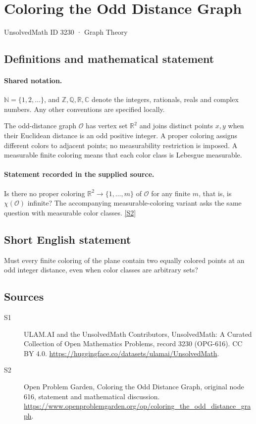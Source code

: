 \documentclass[11pt]{article}
\newcommand{\sref}[2]{\hyperlink{source:#1:#2}{[S#2]}}
\begin{document}
\setcounter{section}{3229}
\section{Coloring the Odd Distance Graph}\label{3230}
{\small\sffamily UnsolvedMath ID 3230 · Graph Theory}
\subsection{Definitions and mathematical statement}

\paragraph{Shared notation.}$\mathbb N=\{1,2,\ldots\}$, and $\mathbb Z,\mathbb Q,\mathbb R,\mathbb C$ denote the integers, rationals, reals and complex numbers. Any other conventions are specified locally.


The odd-distance graph $\mathcal O$ has vertex set $\mathbb R^2$ and joins distinct points $x,y$ when their Euclidean distance is an odd positive integer. A proper coloring assigns different colors to adjacent points; no measurability restriction is imposed. A measurable finite coloring means that each color class is Lebesgue measurable.
\paragraph{Statement recorded in the supplied source.}
Is there no proper coloring $\mathbb R^2\to\{1,\ldots,m\}$ of $\mathcal O$ for any finite $m$, that is, is $\chi(\mathcal O)$ infinite? The accompanying measurable-coloring variant asks the same question with measurable color classes. \sref{3230}{2}
\subsection{Short English statement}
Must every finite coloring of the plane contain two equally colored points at an odd integer distance, even when color classes are arbitrary sets?
\subsection{Sources}
\begin{description}
\item[\hypertarget{source:3230:1}{S1}] ULAM.AI and the UnsolvedMath Contributors, UnsolvedMath: A Curated Collection of Open Mathematics Problems, record 3230 (OPG-616). CC BY 4.0. \url{https://huggingface.co/datasets/ulamai/UnsolvedMath}.
\item[\hypertarget{source:3230:2}{S2}] Open Problem Garden, Coloring the Odd Distance Graph, original node 616, statement and mathematical discussion. \url{https://www.openproblemgarden.org/op/coloring_the_odd_distance_graph}.
\end{description}
\label{end:3230}
\end{document}

